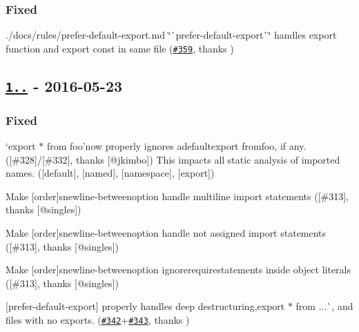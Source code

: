 \subsubsection*{Fixed}


\begin{DoxyItemize}
\item ./docs/rules/prefer-\/default-\/export.md \char`\"{}\`{}prefer-\/default-\/export\`{}\char`\"{} handles {\ttfamily export function} and {\ttfamily export const} in same file (\href{https://github.com/benmosher/eslint-plugin-import/pull/359}{\tt \#359}, thanks \href{https://github.com/scottnonnenberg}{\tt })
\end{DoxyItemize}

\subsection*{\href{https://github.com/benmosher/eslint-plugin-import/compare/v1.8.0...v1.8.1}{\tt 1..} -\/ 2016-\/05-\/23}

\subsubsection*{Fixed}


\begin{DoxyItemize}
\item `export $\ast$ from \textquotesingle{}foo'{\ttfamily now properly ignores a}default{\ttfamily export from}foo{\ttfamily , if any. (\mbox{[}\#328\mbox{]}/\mbox{[}\#332\mbox{]}, thanks \mbox{[}@jkimbo\mbox{]}) This impacts all static analysis of imported names. (\mbox{[}}default{\ttfamily \mbox{]}, \mbox{[}}named{\ttfamily \mbox{]}, \mbox{[}}namespace{\ttfamily \mbox{]}, \mbox{[}}export{\ttfamily \mbox{]})}
\item {\ttfamily Make \mbox{[}}order{\ttfamily \mbox{]}\textquotesingle{}s}newline-\/between{\ttfamily option handle multiline import statements (\mbox{[}\#313\mbox{]}, thanks \mbox{[}@singles\mbox{]})}
\item {\ttfamily Make \mbox{[}}order{\ttfamily \mbox{]}\textquotesingle{}s}newline-\/between{\ttfamily option handle not assigned import statements (\mbox{[}\#313\mbox{]}, thanks \mbox{[}@singles\mbox{]})}
\item {\ttfamily Make \mbox{[}}order{\ttfamily \mbox{]}\textquotesingle{}s}newline-\/between{\ttfamily option ignore}require{\ttfamily statements inside object literals (\mbox{[}\#313\mbox{]}, thanks \mbox{[}@singles\mbox{]})}
\item {\ttfamily \mbox{[}}prefer-\/default-\/export{\ttfamily \mbox{]} properly handles deep destructuring,}export $\ast$ from ...\`{}, and files with no exports. (\href{https://github.com/benmosher/eslint-plugin-import/issues/342}{\tt \#342}+\href{https://github.com/benmosher/eslint-plugin-import/pull/343}{\tt \#343}, thanks \href{https://github.com/scottnonnenberg}{\tt })
\end{DoxyItemize}

